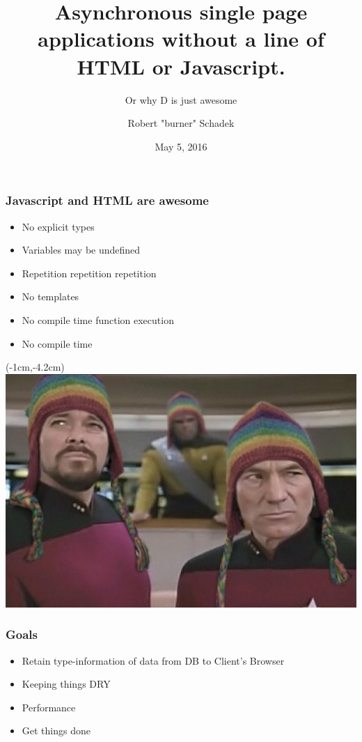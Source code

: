 \documentclass[xelatex,13pt]{beamer}
\title{Asynchronous single page applications without a line of HTML or
Javascript.}
\subtitle{Or why D is just awesome}
\author{Robert "burner" Schadek}
\date{May 5, 2016}
\institute{DConf}
\begin{document}
\maketitle

\begin{frame}
	\frametitle{Javascript and HTML are \textbf{awesome}}
	\begin{itemize}
		\item No explicit types
		\item Variables may be undefined
		\item Repetition repetition repetition
		\item No templates
		\item No compile time function execution
			\pause
		\item No compile time
	\end{itemize}
\end{frame}


\begin{frame}[plain]
\begin{textblock*}{0cm}(-1cm,-4.2cm)
	\includegraphics[width=1.0\paperwidth]{picardriker.jpg}
\end{textblock*}
\end{frame}

\begin{frame}
	\frametitle{Goals}	
	\begin{itemize}
		\item Retain type-information of data from DB to Client's Browser
			\pause
		\item Keeping things DRY	
			\pause
		\item Performance
			\pause
		\item Get things done
	\end{itemize}
\end{frame}
\end{document}
